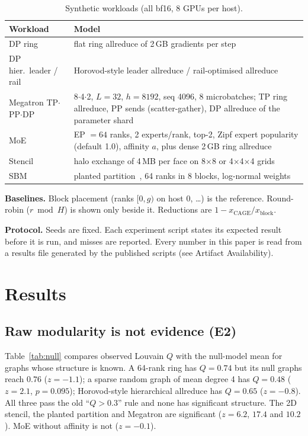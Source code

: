 \documentclass[conference]{IEEEtran}
\begin{document}
\begin{table}[t]
\caption{Synthetic workloads (all bf16, 8 GPUs per host).}\label{tab:workloads}
\centering\footnotesize
\begin{tabular}{@{}lp{4.9cm}@{}}
\toprule
Workload & Model \\
\midrule
DP ring & flat ring allreduce of 2\,GB gradients per step \\
DP hier.\ leader / rail & Horovod-style leader allreduce / rail-optimised allreduce \\
Megatron TP$\cdot$PP$\cdot$DP & 8$\cdot$4$\cdot$2, $L{=}32$, $h{=}8192$, seq 4096, 8 microbatches; TP ring allreduce, PP sends (scatter-gather), DP allreduce of the parameter shard \\
MoE & EP $=64$ ranks, 2 experts/rank, top-2, Zipf expert popularity (default 1.0), affinity $a$, plus dense 2\,GB ring allreduce \\
Stencil & halo exchange of 4\,MB per face on 8$\times$8 or 4$\times$4$\times$4 grids \\
SBM & planted partition~\cite{holland1983sbm}, 64 ranks in 8 blocks, log-normal weights \\
\bottomrule
\end{tabular}
\end{table}

\textbf{Baselines.} Block placement (ranks $[0,g)$ on host 0, \ldots) is the reference. Round-robin
($r \bmod H$) is shown only beside it. Reductions are $1-x_{\mathrm{CAGE}}/x_{\mathrm{block}}$.

\textbf{Protocol.} Seeds are fixed. Each experiment script states its expected result before it
is run, and misses are reported. Every number in this paper is read from a results file generated
by the published scripts (see Artifact Availability).

\section{Results}\label{sec:results}

\subsection{Raw modularity is not evidence (E2)}
Table~\ref{tab:null} compares observed Louvain $Q$ with the null-model mean for graphs whose
structure is known. A 64-rank ring has $Q=0.74$ but its null graphs reach $0.76$ ($z=-1.1$); a
sparse random graph of mean degree 4 has $Q=0.48$ ($z=2.1$, $p=0.095$); Horovod-style hierarchical
allreduce has $Q=0.65$ ($z=-0.8$). All three pass the old ``$Q>0.3$'' rule and none has significant
structure. The 2D stencil, the planted partition and Megatron are significant ($z=6.2$, $17.4$ and
$10.2$). MoE without affinity is not ($z=-0.1$).
\end{document}
